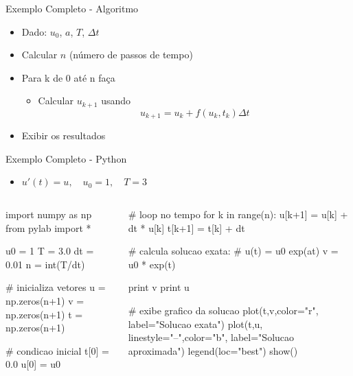 \documentclass[12pt,t,graphics]{beamer}
\begin{document}
\begin{frame}[t,fragile]{Exemplo Completo - Algoritmo}
	\begin{itemize}
		\item Dado: $u_0$, $a$, $T$, $\Delta t$
		\item Calcular $n$ (número de passos de tempo)
		\item Para k de 0 até n faça
		\begin{itemize}
			\item Calcular $u_{k+1}$ usando 
			$$u_{k+1} = u_k + f(u_k, t_k) \Delta t$$
		\end{itemize}
		\item Exibir os resultados
	\end{itemize}
\end{frame}

\begin{frame}[t,fragile]{Exemplo Completo - Python}
	\begin{itemize}
		\item $u'(t) = u, \quad u_0 = 1, \quad T = 3$
	\end{itemize}
	\begin{columns}
		\begin{python}[]
import numpy as np
from pylab import *

u0 = 1
T  = 3.0
dt = 0.01
n  = int(T/dt)

# inicializa vetores
u = np.zeros(n+1)
v = np.zeros(n+1)
t = np.zeros(n+1)

# condicao inicial
t[0] = 0.0
u[0] = u0
\end{python}
\begin{python}[]
# loop no tempo
for k in range(n):
  u[k+1] = u[k] + dt * u[k]
  t[k+1] = t[k] + dt

# calcula solucao exata: 
# u(t) = u0 exp(at)
v = u0 * exp(t)

print v
print u

# exibe grafico da solucao
plot(t,v,color="r",
label="Solucao exata")
plot(t,u,
linestyle="--",color="b",
label="Solucao aproximada")
legend(loc="best")
show()    
		\end{python}
	\end{columns}
\end{frame}
\end{document}
